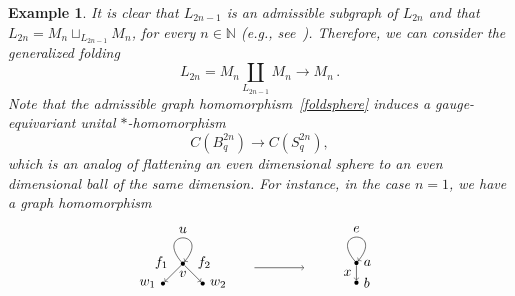 \documentclass[12pt,times,a4paper]{amsart}
\newtheorem{example}[theorem]{Example}
\numberwithin{equation}{section}
\numberwithin{equation}{section}
\begin{document}
\begin{example}
{It is clear that $L_{2n-1}$ is an admissible subgraph of $L_{2n}$ and that $L_{2n}=M_{n}\sqcup_{L_{2n-1}}M_{n}$, 
for every $n\in\mathbb{N}$ (e.g., see~\cite[Section~4.1]{hrt20}). Therefore, we can consider the generalized folding
\begin{equation}\label{foldsphere}
L_{2n}=M_{n}\underset{L_{2n-1}}{\amalg}M_{n}\longrightarrow M_n\,.
\end{equation}
Note that the admissible graph homomorphism~\eqref{foldsphere} induces a gauge-equivariant unital 
\mbox{$*$-ho}\-mo\-mor\-phism
\begin{equation}
C(B^{2n}_q)\longrightarrow C(S^{2n}_q),
\end{equation}
which is an analog of flattening an even dimensional sphere to an even dimensional ball of the same dimension.
For instance, in the case $n=1$, we have a graph homomorphism
\begin{equation}
\begin{tikzpicture}[auto,swap]
\tikzstyle{vertex}=[circle,fill=black,minimum size=3pt,inner sep=0pt]
\tikzstyle{edge}=[draw,->]
\tikzstyle{cycle1}=[draw,->,out=130, in=50, loop, distance=30pt]
   
\node[vertex,label=below:$v$] (0) at (0,0) {};
\node[vertex,label=left:$w_1$] (1) at (-0.5,-0.5) {};
\node[vertex,label=right:$w_2$] (2) at (0.5,-0.5) {};

\path (0) edge[cycle1] node[above] {$u$} (0);
\path (0) edge[edge] node[above left] {$f_1$} (1);
\path (0) edge[edge] node[above right] {$f_2$} (2);

\end{tikzpicture}\quad 
\begin{tikzpicture} 
\node (0) at (0,0) {};
\node (2) at (1.5,0) {};
\node (1) at (0,-0.5) {};
\path (0) edge[draw,->] node {} (2);
\end{tikzpicture}\quad
\begin{tikzpicture}[auto,swap]
\tikzstyle{vertex}=[circle,fill=black,minimum size=3pt,inner sep=0pt]
\tikzstyle{edge}=[draw,->]
\tikzstyle{cycle1}=[draw,->,out=130, in=50, loop, distance=30pt]
   
\node[vertex,label=right:$a$] (0) at (0,0) {};
\node[vertex,label=right:$b$] (1) at (0,-0.5) {};

\path (0) edge[cycle1] node[above] {$e$} (0);
\path (0) edge[edge] node[left] {$x$} (1);


\end{tikzpicture}
\end{equation}}
\end{example}
\end{document}
